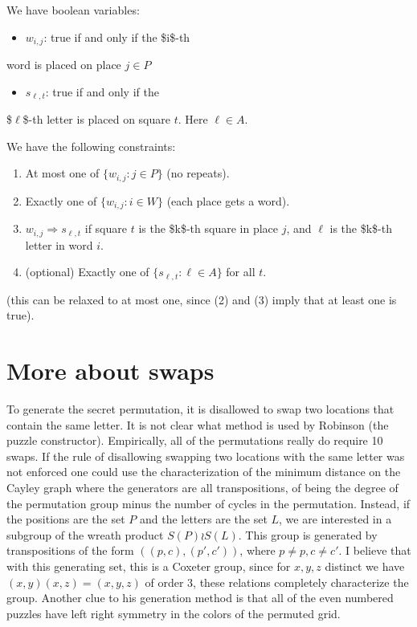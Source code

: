 \documentclass[11pt]{article}
\begin{document}
We have boolean variables:
\begin{itemize}
\item \(w_{i,j}\): true if and only if the \$i\$-th
\end{itemize}
word is placed on place \(j \in P\)
\begin{itemize}
\item \(s_{\ell,t}\): true if and only if the
\end{itemize}
\$\(\ell\)\$-th letter is placed on square \(t\). Here \(\ell \in A\).

We have the following constraints:

\begin{enumerate}
\item At most one of \(\{w_{i,j}: j \in P\}\) (no repeats).
\item Exactly one of \(\{w_{i,j} : i \in W\}\) (each place gets a word).
\item \(w_{i,j} \Rightarrow s_{\ell,t}\) if square \(t\) is the \$k\$-th square in
place \(j\), and \(\ell\) is the \$k\$-th letter in word \(i\).
\item (optional) Exactly one of \(\{s_{\ell,t}: \ell \in A\}\) for all \(t\).
\end{enumerate}
(this can be relaxed to at most one, since (2) and (3) imply that at
least one is true).
\section{More about swaps}
\label{sec:orgaf46560}
To generate the secret permutation, it is disallowed to swap two
locations that contain the same letter.  It is not clear what method
is used by Robinson (the puzzle constructor).  Empirically, all of the
permutations really do require 10 swaps.  If the rule of disallowing
swapping two locations with the same letter was not enforced one could
use the characterization of the minimum distance on the Cayley graph
where the generators are all transpositions, of being the degree of
the permutation group minus the number of cycles in the permutation.
Instead, if the positions are the set \(P\) and the letters are the set
\(L\), we are interested in a subgroup of the wreath product \(S(P) \wr
S(L)\).  This group is generated by transpositions of the form \(((p,c),
(p',c'))\), where \(p \ne p, c \ne c'\).  I believe that with this
generating set, this is a Coxeter group, since for \(x,y,z\) distinct we
have \((x,y)(x,z) = (x,y,z)\)  of order 3, these relations completely
characterize the group.  Another clue to his generation method is that
all of the even numbered puzzles have left right symmetry in the
colors of the permuted grid.
\end{document}
